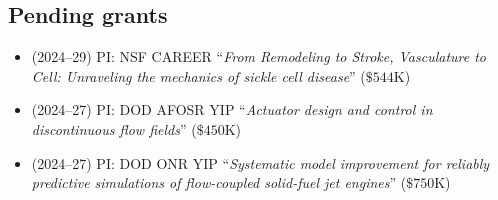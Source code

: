 \subsection{Pending grants}

\begin{itemize}
    \item (2024--29) PI: NSF CAREER ``\textit{From Remodeling to Stroke, Vasculature to Cell: Unraveling the mechanics of sickle cell disease}'' ($\$544$K)
    \item (2024--27) PI: DOD AFOSR YIP ``\textit{Actuator design and control in discontinuous flow fields}'' ($\$450$K)
    \item (2024--27) PI: DOD ONR YIP ``\textit{Systematic model improvement for reliably predictive simulations of flow-coupled solid-fuel jet engines}'' ($\$750$K)
\end{itemize}
